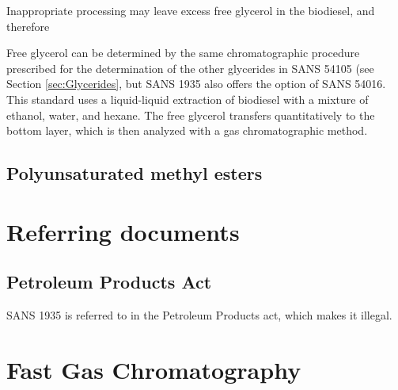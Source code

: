 Inappropriate processing may leave excess free glycerol in the biodiesel, and therefore

Free glycerol can be determined by the same chromatographic procedure prescribed
for the determination of the other glycerides in SANS 54105 (see Section
\ref{sec:Glycerides}, but SANS 1935 also offers the option of SANS 54016. This
standard uses a liquid-liquid extraction of biodiesel with a mixture of ethanol,
water, and hexane. The free glycerol transfers quantitatively to the bottom
layer, which is then analyzed with a gas chromatographic method.

\subsection{Polyunsaturated methyl esters}
\label{sec:ChromDetUnsat}

\section{Referring documents}

\subsection{Petroleum Products Act}

SANS 1935 is referred to in the Petroleum Products act, which makes it illegal. 

\section{Fast Gas Chromatography}


\todos